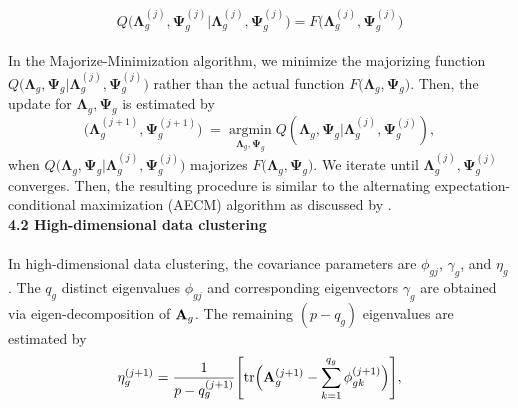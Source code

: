 \documentclass[11pt]{article}
\begin{document}
$$Q\bigl(\boldsymbol{\Lambda}_g^{(j)},\boldsymbol{\Psi}_g^{(j)}|\boldsymbol{\Lambda}_g^{(j)},\boldsymbol{\Psi}_g^{(j)}\bigr) = F\bigl(\boldsymbol{\Lambda}_g^{(j)},\boldsymbol{\Psi}_g^{(j)}\bigr)$$
\\
In the Majorize-Minimization algorithm, we minimize the majorizing function $Q\bigl(\boldsymbol{\Lambda}_g,\boldsymbol{\Psi}_g|\boldsymbol{\Lambda}_g^{(j)},\boldsymbol{\Psi}_g^{(j)}\bigr)$ rather than the actual function $F\bigl(\boldsymbol{\Lambda}_g,\boldsymbol{\Psi}_g\bigr)$. Then, the update for $\boldsymbol{\Lambda}_g,\boldsymbol{\Psi}_g$ is estimated by 
\\
$$\bigl(\boldsymbol{\Lambda}_g^{(j+1)},\boldsymbol{\Psi}_g^{(j+1)}\bigr)\;=\;\underset{\boldsymbol{\Lambda}_g,\boldsymbol{\Psi}_g}{\mathrm{argmin}}\;Q(\boldsymbol{\Lambda}_g,\boldsymbol{\Psi}_g|\boldsymbol{\Lambda}_g^{(j)},\boldsymbol{\Psi}_g^{(j)}),$$
when $Q\bigl(\boldsymbol{\Lambda}_g,\boldsymbol{\Psi}_g|\boldsymbol{\Lambda}_g^{(j)},\boldsymbol{\Psi}_g^{(j)}\bigr)$ majorizes $F\bigl(\boldsymbol{\Lambda}_g,\boldsymbol{\Psi}_g\bigr).$ We iterate until $\boldsymbol{\Lambda}_g^{(j)}, \boldsymbol{\Psi}_g^{(j)}$ converges. Then, the resulting procedure is similar to the alternating expectation-conditional maximization (AECM) algorithm as discussed by \cite{meng1993maximum}.
\\ 
\textbf{4.2 High-dimensional data clustering}\\
\\
In high-dimensional data clustering, the covariance parameters are $\phi_{gj}$, $\gamma_g$, and $\eta_g$. The $q_g$ distinct eigenvalues $\phi_{gj}$ and corresponding eigenvectors $\gamma_g$ are obtained via eigen-decomposition of $\bold{A}_g$. The remaining $(p-q_g)$ eigenvalues are estimated by
\\
$$\eta_g^{(j+1)} = \frac{1}{p-q_g^{(j+1)}}\Biggl[\text{tr}\Bigl(\bold{A}_g^{(j+1)}-\sum_{k=1}^{q_g}\phi_{gk}^{(j+1)}\Bigr)\Biggr],$$
\\
\end{document}
